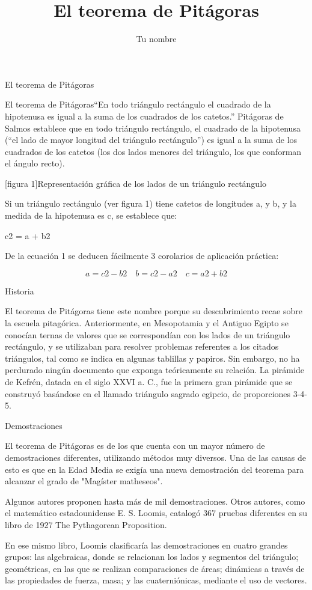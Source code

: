 \documentclass[12pt,letterpaper,twocolumn]{article}
\author{Tu nombre}
\title{El teorema de Pitágoras}
\begin{document}
El teorema de Pitágoras

El teorema de Pitágoras{``En todo triángulo rectángulo el cuadrado de la hipotenusa es igual a la suma de los cuadrados de los catetos.'' Pitágoras de Salmos} establece que en todo triángulo rectángulo, el cuadrado de la hipotenusa (``el lado de mayor longitud del triángulo rectángulo'') es igual a la suma de los cuadrados de los catetos (los dos lados menores del triángulo, los que conforman el ángulo recto).

[figura 1]{Representación gráfica de los lados de un triángulo rectángulo}

Si un triángulo rectángulo (ver figura 1) tiene catetos de longitudes a, y b, y la medida de la hipotenusa es c, se establece que:

c2 = a + b2
  
De la ecuación 1 se deducen fácilmente 3 corolarios de aplicación práctica:

\[
a = c2 - b2 \quad  b = c2-a2 \quad  c = a2 + b2
\]


Historia

El teorema de Pitágoras tiene este nombre porque su descubrimiento recae sobre la escuela pitagórica. Anteriormente, en Mesopotamia y el Antiguo Egipto se conocían ternas de valores que se correspondían con los lados de un triángulo rectángulo, y se utilizaban para resolver problemas referentes a los citados triángulos, tal como se indica en algunas tablillas y papiros. Sin embargo, no ha perdurado ningún documento que exponga teóricamente su relación. La pirámide de Kefrén, datada en el siglo XXVI a. C., fue la primera gran pirámide que se construyó basándose en el llamado triángulo sagrado egipcio, de proporciones 3-4-5.

Demostraciones

El teorema de Pitágoras es de los que cuenta con un mayor número de demostraciones diferentes, utilizando métodos muy diversos. Una de las causas de esto es que en la Edad Media se exigía una nueva demostración del teorema para alcanzar el grado de "Magíster matheseos".

Algunos autores proponen hasta más de mil demostraciones. Otros autores, como el matemático estadounidense E. S. Loomis, catalogó 367 pruebas diferentes en su libro de 1927 The Pythagorean Proposition.

En ese mismo libro, Loomis clasificaría las demostraciones en cuatro grandes grupos: las algebraicas, donde se relacionan los lados y segmentos del triángulo; geométricas, en las que se realizan comparaciones de áreas; dinámicas a través de las propiedades de fuerza, masa; y las cuaterniónicas, mediante el uso de vectores.
\end{document}
